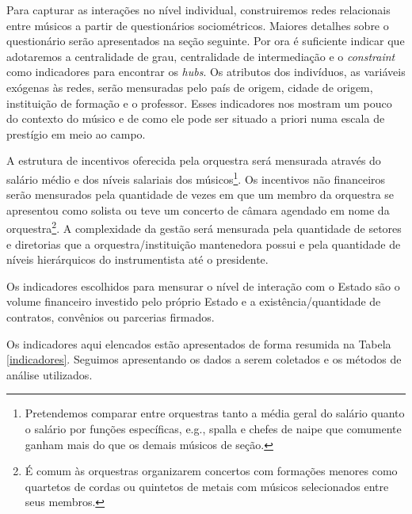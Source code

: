\documentclass[a4paper, 12pt, openright, oneside, german, french, english, brazil]{abntex2}
\begin{document}
	Para capturar as interações no nível individual, construiremos redes relacionais entre músicos a partir de questionários sociométricos. Maiores detalhes sobre o questionário serão apresentados na seção seguinte. Por ora é suficiente indicar que adotaremos a centralidade de grau, centralidade de intermediação e o \textit{constraint} como indicadores para encontrar os \textit{hubs}. Os atributos dos indivíduos, as variáveis exógenas às redes, serão mensuradas pelo país de origem, cidade de origem, instituição de formação e o professor. Esses indicadores nos mostram um pouco do contexto do músico e de como ele pode ser situado a priori numa escala de prestígio em meio ao campo.

	A estrutura de incentivos oferecida pela orquestra será mensurada através do salário médio e dos níveis salariais dos músicos\footnote{Pretendemos comparar entre orquestras tanto a média geral do salário quanto o salário por funções específicas, e.g., spalla e chefes de naipe que comumente ganham mais do que os demais músicos de seção.}. Os incentivos não financeiros serão mensurados pela quantidade de vezes em que um membro da orquestra se apresentou como solista ou teve um concerto de câmara agendado em nome da orquestra\footnote{É comum às orquestras organizarem concertos com formações menores como quartetos de cordas ou quintetos de metais com músicos selecionados entre seus membros.}. A complexidade da gestão será mensurada pela quantidade de setores e diretorias que a orquestra/instituição mantenedora possui e pela quantidade de níveis hierárquicos do instrumentista até o presidente.

	Os indicadores escolhidos para mensurar o nível de interação com o Estado são o volume financeiro investido pelo próprio Estado e a existência/quantidade de contratos, convênios ou parcerias firmados.

	Os indicadores aqui elencados estão apresentados de forma resumida na Tabela \ref{indicadores}. Seguimos apresentando os dados a serem coletados e os métodos de análise utilizados.
\end{document}
